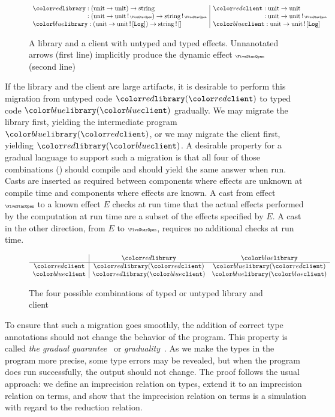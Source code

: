 \begin{figure}[H]
$$
\begin{array}{l|l}
  \dhandler : (\tyunit \to \tyunit) \to \tystring & \dclient : \tyunit \to \tyunit \\
  \hphantom{\dhandler} : (\tyunit \to \tyunit\,!\,\effany) \to \tystring\,!\,\effany & \hphantom{\dclient} : \tyunit \to \tyunit\,!\,\effany \\
  \shandler : (\tyunit \to \tyunit\,!\,\eflog) \to \tystring \,!\, \efnone & \sclient : \tyunit \to \tyunit\,!\,\eflog
\end{array}
$$
  \caption{A library and a client with {\color{red}untyped} and {\color{blue}typed} effects. Unnanotated arrows (first line) implicitly produce the dynamic effect $\effany$ (second line)}
\label{fig:app-example}
\end{figure}

If the library and the client are large artifacts, it is desirable to
perform this migration from untyped code $\dhandler(\dclient)$ to typed code $\shandler(\sclient)$ gradually.
We may migrate the library first, yielding the intermediate program $\shandler(\dclient)$,
or we may migrate the client first, yielding $\dhandler(\sclient)$.
A desirable property for a gradual language to support such a migration is that all
four of those combinations ()
should compile and should yield the same answer when run.
Casts are inserted as required between components where effects are unknown at compile time
and components where effects are known. A cast from effect $\effany$ to a known effect $E$
checks at run time that the actual effects performed by the computation at run time are
a subset of the effects specified by $E$. A cast in the other direction,
from $E$ to $\effany$, requires no additional checks at run time.

\begin{figure}[H]
$$
\begin{array}{c|cc}
  & \dhandler & \shandler \\
  \hline
  \dclient & \dhandler(\dclient) & \shandler(\dclient) \\
  \sclient & \dhandler(\sclient) & \shandler(\sclient)
\end{array}
$$
\caption{The four possible combinations of typed or untyped library and client}
\label{fig:migration-example}
\end{figure}

To ensure that such a migration goes smoothly, the addition of correct type annotations
should not change the behavior of the program. This property
is called \emph{the gradual guarantee}~\citep{siek2015} or \emph{graduality}~\citep{new-ahmed-2018}.
As we make the types in the program more precise, some type errors may be
revealed, but when the program does run successfully, the output
should not change. The proof follows the usual approach:
we define an imprecision relation on types, extend it
to an imprecision relation on terms, and show that the imprecision relation on
terms is a simulation with regard to the reduction relation.

